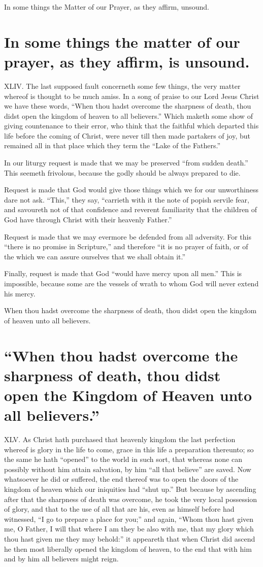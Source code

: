 In some things the Matter of our Prayer, as they affirm, unsound.
\section*{In some things the matter of our prayer, as they affirm, is unsound.}
XLIV. The last supposed fault concerneth some few things, the very matter whereof is thought to be much amiss. In a song of praise to our Lord Jesus Christ we have these words, “When thou hadst overcome the sharpness of death, thou didst open the kingdom of heaven to all believers.” Which maketh some show of giving countenance to their  error, who think that the faithful which departed this life before the coming of Christ,
 were never till then made partakers of joy, but remained all in that place which they term the “Lake of the Fathers.”

In our liturgy request is made that we may be preserved “from sudden death.” This seemeth frivolous, because the godly should be always prepared to die.

Request is made that God would give those things which we for our unworthiness dare not ask. “This,” they say, “carrieth with it the note of popish servile fear, and savoureth not of that confidence and reverent familiarity that the children of God have through Christ with their heavenly Father.”

Request is made that we may evermore be defended from all adversity. For this “there is no promise in Scripture,” and therefore “it is no prayer of faith, or of the which we can assure ourselves that we shall obtain it.”

Finally, request is made that God “would have mercy upon all men.” This is impossible, because some are the vessels of wrath to whom God will never extend his mercy.


When thou hadst overcome the sharpness of death, thou didst open the kingdom of heaven unto all believers.
\section*{“When thou hadst overcome the sharpness of death, thou didst open the Kingdom of Heaven unto all believers.”}
XLV. As Christ hath purchased that heavenly kingdom the last perfection whereof is glory in the life to come, grace in this life a preparation thereunto; so the same he hath “opened” to the world in such sort, that whereas none can possibly without him attain salvation, by him “all that believe” are saved. Now whatsoever he did or suffered, the end thereof was to open the doors of the kingdom of heaven which our iniquities had “shut up.” But because by ascending  after that the sharpness of death was overcome, he took the very local possession of glory, and that to the use of all that are his, even as himself before had witnessed,
 “I go to prepare a place for you;” and again, “Whom thou hast given me, O Father, I will that where I am they be also with me, that my glory which thou hast given me they may behold:” it appeareth that when Christ did ascend he then most liberally opened the kingdom of heaven, to the end that with him and by him all believers might reign.


